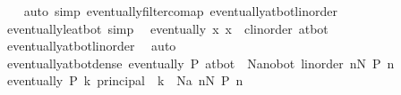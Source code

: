 \begin{isabellebody}
%
\isadelimproof
\ \ %
\endisadelimproof
%
\isatagproof
{}\isamarkupfalse%
\ {\isacharparenleft}{\kern0pt}auto\ simp{\isacharcolon}{\kern0pt}\ eventually{\isacharunderscore}{\kern0pt}filtercomap\ eventually{\isacharunderscore}{\kern0pt}at{\isacharunderscore}{\kern0pt}bot{\isacharunderscore}{\kern0pt}linorder{\isacharparenright}{\kern0pt}%
\endisatagproof
{\isafoldproof}%
%
\isadelimproof
\isanewline
%
\endisadelimproof
\isanewline
{}\isamarkupfalse%
\ eventually{\isacharunderscore}{\kern0pt}le{\isacharunderscore}{\kern0pt}at{\isacharunderscore}{\kern0pt}bot\ {\isacharbrackleft}{\kern0pt}simp{\isacharbrackright}{\kern0pt}{\isacharcolon}{\kern0pt}\isanewline
\ \ {\isachardoublequoteopen}eventually\ {\isacharparenleft}{\kern0pt}{\isasymlambda}x{\isachardot}{\kern0pt}\ x\ {\isasymle}\ {\isacharparenleft}{\kern0pt}c{\isacharcolon}{\kern0pt}{\isacharcolon}{\kern0pt}{\isacharunderscore}{\kern0pt}{\isacharcolon}{\kern0pt}{\isacharcolon}{\kern0pt}linorder{\isacharparenright}{\kern0pt}{\isacharparenright}{\kern0pt}\ at{\isacharunderscore}{\kern0pt}bot{\isachardoublequoteclose}\isanewline
%
\isadelimproof
\ \ %
\endisadelimproof
%
\isatagproof
{}\isamarkupfalse%
\ eventually{\isacharunderscore}{\kern0pt}at{\isacharunderscore}{\kern0pt}bot{\isacharunderscore}{\kern0pt}linorder\ \isamarkupfalse%
\ auto%
\endisatagproof
{\isafoldproof}%
%
\isadelimproof
\isanewline
%
\endisadelimproof
\isanewline
{}\isamarkupfalse%
\ eventually{\isacharunderscore}{\kern0pt}at{\isacharunderscore}{\kern0pt}bot{\isacharunderscore}{\kern0pt}dense{\isacharcolon}{\kern0pt}\ {\isachardoublequoteopen}eventually\ P\ at{\isacharunderscore}{\kern0pt}bot\ {\isasymlongleftrightarrow}\ {\isacharparenleft}{\kern0pt}{\isasymexists}N{\isacharcolon}{\kern0pt}{\isacharcolon}{\kern0pt}{\isacharprime}{\kern0pt}a{\isacharcolon}{\kern0pt}{\isacharcolon}{\kern0pt}{\isacharbraceleft}{\kern0pt}no{\isacharunderscore}{\kern0pt}bot{\isacharcomma}{\kern0pt}\ linorder{\isacharbraceright}{\kern0pt}{\isachardot}{\kern0pt}\ {\isasymforall}n{\isacharless}{\kern0pt}N{\isachardot}{\kern0pt}\ P\ n{\isacharparenright}{\kern0pt}{\isachardoublequoteclose}\isanewline
%
\isadelimproof
%
\endisadelimproof
%
\isatagproof
{}\isamarkupfalse%
\ {\isacharminus}{\kern0pt}\isanewline
\ \ \isamarkupfalse%
\ {\isachardoublequoteopen}eventually\ P\ {\isacharparenleft}{\kern0pt}{\isasymSqinter}k{\isachardot}{\kern0pt}\ principal\ {\isacharbraceleft}{\kern0pt}{\isachardot}{\kern0pt}{\isachardot}{\kern0pt}{\isacharless}{\kern0pt}\ k{\isacharbraceright}{\kern0pt}{\isacharparenright}{\kern0pt}\ {\isasymlongleftrightarrow}\ {\isacharparenleft}{\kern0pt}{\isasymexists}N{\isacharcolon}{\kern0pt}{\isacharcolon}{\kern0pt}{\isacharprime}{\kern0pt}a{\isachardot}{\kern0pt}\ {\isasymforall}n{\isacharless}{\kern0pt}N{\isachardot}{\kern0pt}\ P\ n{\isacharparenright}{\kern0pt}{\isachardoublequoteclose}\isanewline

\end{isabellebody}
